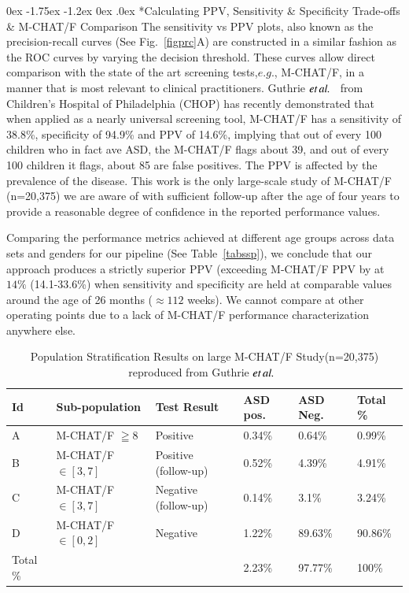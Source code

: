 \documentclass[onecolumn, compsoc,11pt]{IEEEtran}
\makeatletter
\renewcommand\subsection{\@startsection {subsection}{2}{\z@}%
                                   {0ex \@plus -1.75ex \@minus -1.2ex}%
                                   {0ex \@plus.0ex}%
                                   {\fontsize{11}{11}\selectfont\bfseries\sffamily\color{black}}}
\renewcommand{\captionN}[1]{\caption{\color{CadetBlue4!80!black} \sffamily \fontsize{9}{10}\selectfont #1  }}
\makeatother
\begin{document}
\subsection*{Calculating PPV, Sensitivity \& Specificity Trade-offs \& M-CHAT/F Comparison}
The sensitivity vs PPV plots, also known as the precision-recall curves (See Fig.~\ref{figprc}A) are constructed in a similar fashion as the ROC curves by varying the decision threshold. These curves  allow direct comparison with the  state of the art screening tests,$e.g.$, M-CHAT/F, in a manner that is most relevant to clinical practitioners.
%
Guthrie $\textit{et} \mspace{3mu} \textit{al.}$~\cite{pmid31562252} from Children's Hospital of Philadelphia (CHOP) has recently demonstrated that when applied as a nearly universal screening tool, M-CHAT/F has a sensitivity of 38.8\%, specificity of 94.9\% and PPV of 14.6\%, implying that out of every 100 children who in fact ave ASD, the M-CHAT/F flags about 39, and out of every 100 children it flags, about 85 are false positives. The PPV is affected by the prevalence of the disease. This work is the only large-scale study of M-CHAT/F (n=20,375) we are aware of with sufficient follow-up after the age of four years to provide a reasonable degree of confidence in the reported performance values.

Comparing the performance metrics achieved at different age groups across data sets and genders for our pipeline (See Table~\ref{tabssp}), we conclude that our approach produces a strictly superior PPV (exceeding M-CHAT/F PPV by at  $14\%$ (14.1-33.6\%) when sensitivity and specificity are held at comparable values around the age of 26 months ($\approx 112$ weeks). We cannot compare at other operating points due to a lack of M-CHAT/F performance characterization anywhere else.
\begin{table}[t]
  \centering

  \captionN{Population Stratification Results on large M-CHAT/F Study(n=20,375)  reproduced from Guthrie $\textit{et} \mspace{3mu} \textit{al.}$~\cite{pmid31562252} }\label{tabCHOP}
\footnotesize
  \begin{tabular}{C{.65in} | L{1.5in}|L{1.5in}|L{1in}|L{1in}||L{.55in}}\hline
 \bf \sffamily   Id &  \bf \sffamily Sub-population & \bf \sffamily Test Result & \bf \sffamily ASD pos. & \bf \sffamily ASD Neg. & \bf \sffamily Total \% \\\hline
   A &  M-CHAT/F $\geqq 8$ & Positive & 0.34\% & 0.64\% & 0.99\% \\\hline
  B &   M-CHAT/F $\in [3,7]$ & Positive (follow-up)& 0.52\% & 4.39\% & 4.91\% \\\hline
 C &    M-CHAT/F $\in [3,7]$ & Negative (follow-up)& 0.14\% & 3.1\% & 3.24\% \\\hline
  D &   M-CHAT/F $\in [0,2] $ & Negative & 1.22\% & 89.63\% & 90.86\% \\\hline\hline
    Total \%& &   &2.23\% & 97.77\% & 100\% \\\hline
    \end{tabular}
\end{table}
\end{document}
